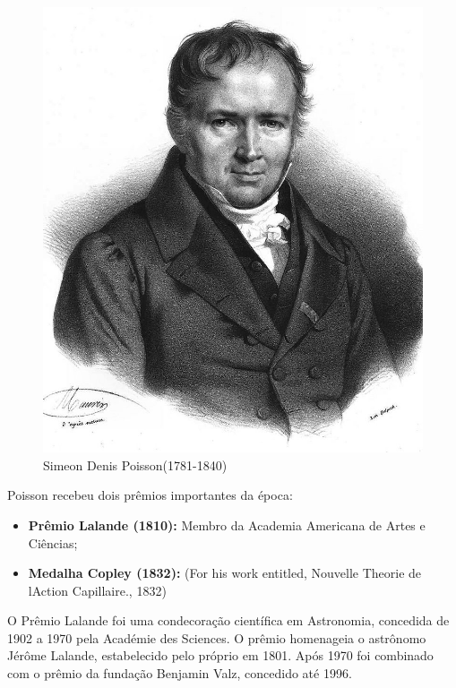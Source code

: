 \vspace{-1.69cm}
\begin{figure}
    \centering
\includegraphics[scale=0.2]{figures/Simeon_Poisson.jpeg}
    \caption{Simeon Denis Poisson(1781-1840)}
    \label{fig:my_label4}
\end{figure}

\newpage
Poisson recebeu dois prêmios importantes da época:

\begin{itemize}
    \item \textbf{Prêmio Lalande (1810):} Membro da Academia Americana de Artes e Ciências;
    \item \textbf{Medalha Copley (1832):} (For his work entitled, Nouvelle Theorie de lAction Capillaire., 1832)
\end{itemize}

O Prêmio Lalande foi uma condecoração científica em Astronomia, concedida de 1902 a 1970 pela Académie des Sciences. O prêmio homenageia o astrônomo Jérôme Lalande, estabelecido pelo próprio em 1801. Após 1970 foi combinado com o prêmio da fundação Benjamin Valz, concedido até 1996.\vskip0.3cm



